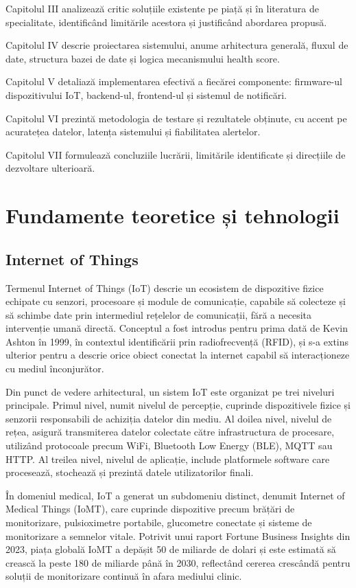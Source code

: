 ﻿\documentclass[12pt,a4paper,twoside]{article}
\begin{document}
Capitolul III analizează critic soluțiile existente pe piață și în literatura de specialitate, identificând limitările acestora și justificând abordarea propusă.

Capitolul IV descrie proiectarea sistemului, anume arhitectura generală, fluxul de date, structura bazei de date și logica mecanismului health score.

Capitolul V detaliază implementarea efectivă a fiecărei componente: firmware-ul dispozitivului IoT, backend-ul, frontend-ul și sistemul de notificări.

Capitolul VI prezintă metodologia de testare și rezultatele obținute, cu accent pe acuratețea datelor, latența sistemului și fiabilitatea alertelor.

Capitolul VII formulează concluziile lucrării, limitările identificate și direcțiile de dezvoltare ulterioară.

\newpage
\section{Fundamente teoretice și tehnologii}

\subsection{Internet of Things}

Termenul Internet of Things (IoT) descrie un ecosistem de dispozitive fizice echipate cu senzori, procesoare și module de comunicație, capabile să colecteze și să schimbe date prin intermediul rețelelor de comunicații, fără a necesita intervenție umană directă. Conceptul a fost introdus pentru prima dată de Kevin Ashton în 1999, în contextul identificării prin radiofrecvență (RFID), și s-a extins ulterior pentru a descrie orice obiect conectat la internet capabil să interacționeze cu mediul înconjurător.

Din punct de vedere arhitectural, un sistem IoT este organizat pe trei niveluri principale. Primul nivel, numit nivelul de percepție, cuprinde dispozitivele fizice și senzorii responsabili de achiziția datelor din mediu. Al doilea nivel, nivelul de rețea, asigură transmiterea datelor colectate către infrastructura de procesare, utilizând protocoale precum WiFi, Bluetooth Low Energy (BLE), MQTT sau HTTP. Al treilea nivel, nivelul de aplicație, include platformele software care procesează, stochează și prezintă datele utilizatorilor finali.

În domeniul medical, IoT a generat un subdomeniu distinct, denumit Internet of Medical Things (IoMT), care cuprinde dispozitive precum brățări de monitorizare, pulsioximetre portabile, glucometre conectate și sisteme de monitorizare a semnelor vitale. Potrivit unui raport Fortune Business Insights din 2023, piața globală IoMT a depășit 50 de miliarde de dolari și este estimată să crească la peste 180 de miliarde până în 2030, reflectând cererea crescândă pentru soluții de monitorizare continuă în afara mediului clinic.
\end{document}

